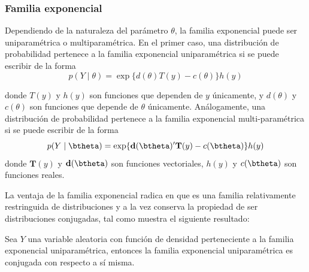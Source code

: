 \documentclass[10pt,openright]{book}\usepackage[]{graphicx}\usepackage[]{color}
\begin{document}
\subsubsection*{Familia exponencial}

Dependiendo de la naturaleza del parámetro $\theta$, la familia exponencial puede ser uniparamétrica o multiparamétrica. En el primer caso, una distribución de probabilidad pertenece a la familia exponencial uniparamétrica si se puede escribir de la forma
\begin{equation}\label{uniexpo}
p(Y \mid \theta)=\exp\{d(\theta)T(y)-c(\theta)\}h(y)
\end{equation}

donde $T(y)$ y $h(y)$ son funciones que dependen de $y$ únicamente, y $d(\theta)$ y $c(\theta)$ son funciones que depende de $\theta$ únicamente. Análogamente, una distribución de probabilidad pertenece a la familia exponencial multi-paramétrica si se puede escribir de la forma
\begin{equation}\label{multiexpo}
p(Y \mid \btheta)=\exp\{\mathbf{d}(\btheta)'\mathbf{T}(y)-c(\btheta)\}h(y)
\end{equation}
donde $\mathbf{T}(y)$ y $\mathbf{d}(\btheta)$ son funciones vectoriales, $h(y)$ y $c(\btheta)$ son funciones reales.

La ventaja de la familia exponencial radica en que es una familia relativamente restringuida de distribuciones y a la vez conserva la propiedad de ser distribuciones conjugadas, tal como muestra el siguiente resultado:

\begin{Res}\label{FE1}
Sea $Y$ una variable aleatoria con función de densidad perteneciente a la familia exponencial uniparamétrica, entonces la familia exponencial uniparamétrica es conjugada con respecto a sí misma.
\end{Res}
\end{document}
